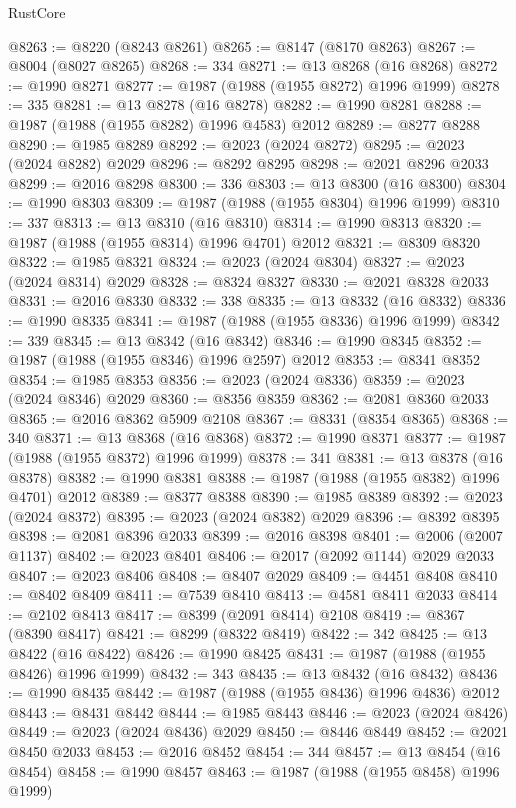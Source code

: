 \begin{lexlean}{RustCore}
\begin{coremodule}
@8263 := @8220 (@8243 @8261)
@8265 := @8147 (@8170 @8263)
@8267 := @8004 (@8027 @8265)
@8268 := 334
@8271 := @13 @8268 (@16 @8268)
@8272 := @1990 @8271
@8277 := @1987 (@1988 (@1955 @8272) @1996 @1999)
@8278 := 335
@8281 := @13 @8278 (@16 @8278)
@8282 := @1990 @8281
@8288 := @1987 (@1988 (@1955 @8282) @1996 @4583) @2012
@8289 := @8277 @8288
@8290 := @1985 @8289
@8292 := @2023 (@2024 @8272)
@8295 := @2023 (@2024 @8282) @2029
@8296 := @8292 @8295
@8298 := @2021 @8296 @2033
@8299 := @2016 @8298
@8300 := 336
@8303 := @13 @8300 (@16 @8300)
@8304 := @1990 @8303
@8309 := @1987 (@1988 (@1955 @8304) @1996 @1999)
@8310 := 337
@8313 := @13 @8310 (@16 @8310)
@8314 := @1990 @8313
@8320 := @1987 (@1988 (@1955 @8314) @1996 @4701) @2012
@8321 := @8309 @8320
@8322 := @1985 @8321
@8324 := @2023 (@2024 @8304)
@8327 := @2023 (@2024 @8314) @2029
@8328 := @8324 @8327
@8330 := @2021 @8328 @2033
@8331 := @2016 @8330
@8332 := 338
@8335 := @13 @8332 (@16 @8332)
@8336 := @1990 @8335
@8341 := @1987 (@1988 (@1955 @8336) @1996 @1999)
@8342 := 339
@8345 := @13 @8342 (@16 @8342)
@8346 := @1990 @8345
@8352 := @1987 (@1988 (@1955 @8346) @1996 @2597) @2012
@8353 := @8341 @8352
@8354 := @1985 @8353
@8356 := @2023 (@2024 @8336)
@8359 := @2023 (@2024 @8346) @2029
@8360 := @8356 @8359
@8362 := @2081 @8360 @2033
@8365 := @2016 @8362 @5909 @2108
@8367 := @8331 (@8354 @8365)
@8368 := 340
@8371 := @13 @8368 (@16 @8368)
@8372 := @1990 @8371
@8377 := @1987 (@1988 (@1955 @8372) @1996 @1999)
@8378 := 341
@8381 := @13 @8378 (@16 @8378)
@8382 := @1990 @8381
@8388 := @1987 (@1988 (@1955 @8382) @1996 @4701) @2012
@8389 := @8377 @8388
@8390 := @1985 @8389
@8392 := @2023 (@2024 @8372)
@8395 := @2023 (@2024 @8382) @2029
@8396 := @8392 @8395
@8398 := @2081 @8396 @2033
@8399 := @2016 @8398
@8401 := @2006 (@2007 @1137)
@8402 := @2023 @8401
@8406 := @2017 (@2092 @1144) @2029 @2033
@8407 := @2023 @8406
@8408 := @8407 @2029
@8409 := @4451 @8408
@8410 := @8402 @8409
@8411 := @7539 @8410
@8413 := @4581 @8411 @2033
@8414 := @2102 @8413
@8417 := @8399 (@2091 @8414) @2108
@8419 := @8367 (@8390 @8417)
@8421 := @8299 (@8322 @8419)
@8422 := 342
@8425 := @13 @8422 (@16 @8422)
@8426 := @1990 @8425
@8431 := @1987 (@1988 (@1955 @8426) @1996 @1999)
@8432 := 343
@8435 := @13 @8432 (@16 @8432)
@8436 := @1990 @8435
@8442 := @1987 (@1988 (@1955 @8436) @1996 @4836) @2012
@8443 := @8431 @8442
@8444 := @1985 @8443
@8446 := @2023 (@2024 @8426)
@8449 := @2023 (@2024 @8436) @2029
@8450 := @8446 @8449
@8452 := @2021 @8450 @2033
@8453 := @2016 @8452
@8454 := 344
@8457 := @13 @8454 (@16 @8454)
@8458 := @1990 @8457
@8463 := @1987 (@1988 (@1955 @8458) @1996 @1999)

\end{coremodule}
\end{lexlean}
